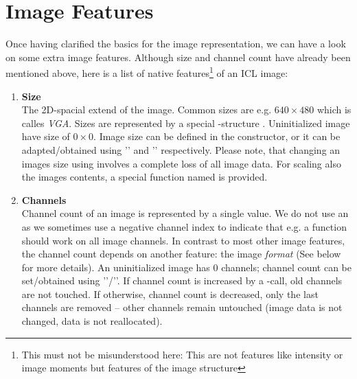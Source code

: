 \section{Image Features}
Once having clarified the basics for the image representation, we can have a look on some extra image features. Although size and channel count have already been mentioned above, here is a list of native features\footnote{This must not be misunderstood here: This are not features like intensity or image moments but features of the image structure} of an ICL image:

\begin{enumerate}

\item \textbf{Size}
\\The 2D-spacial extend of the image. Common sizes are e.g. $640 \times{} 480$ which is calles \emph{VGA}. Sizes are represented by a special -structure . Uninitialized image have size of $0 \times{} 0$. Image size can be defined in the constructor, or it can be adapted/obtained using '' and '' respectively. Please note, that changing an images size using  involves a complete loss of all image data. For scaling also the images contents, a special function named  is provided. 
\item \textbf{Channels}\\
 Channel count of an image is represented by a single  value. We do not use an  as we sometimes use a negative channel index to indicate that e.g. a function should work on all image channels. In contrast to most other image features, the channel count depends on another feature: the image \emph{format} (See below for more details). An uninitialized image has $0$ channels; channel count can be set/obtained using ''/''. If channel count is increased by a -call, old channels are not touched. If otherwise, channel count is decreased, only the last channels are removed -- other channels remain untouched (image data is not changed, data is not reallocated).


\end{enumerate}
